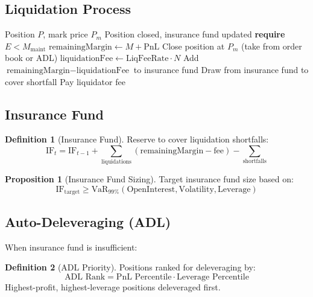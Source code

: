 \documentclass[11pt,a4paper]{article}
\theoremstyle{definition}
\newtheorem{definition}{Definition}
\newtheorem{proposition}{Proposition}
\begin{document}
\subsection{Liquidation Process}

\begin{algorithm}
\caption{Position Liquidation}
\begin{algorithmic}[1]
\Require Position $P$, mark price $P_m$
\Ensure Position closed, insurance fund updated
\State \textbf{require} $E < M_{\text{maint}}$
\State $\text{remainingMargin} \gets M + \text{PnL}$
\State Close position at $P_m$ (take from order book or ADL)
\State $\text{liquidationFee} \gets \text{LiqFeeRate} \cdot N$
\State Add $\text{remainingMargin} - \text{liquidationFee}$ to insurance fund
\Else
\State Draw from insurance fund to cover shortfall
\EndIf
\State Pay liquidator fee
\end{algorithmic}
\end{algorithm}

\subsection{Insurance Fund}

\begin{definition}[Insurance Fund]
Reserve to cover liquidation shortfalls:
\begin{equation}
\text{IF}_t = \text{IF}_{t-1} + \sum_{\text{liquidations}} (\text{remainingMargin} - \text{fee}) - \sum_{\text{shortfalls}}
\end{equation}
\end{definition}

\begin{proposition}[Insurance Fund Sizing]
Target insurance fund size based on:
\begin{equation}
\text{IF}_{\text{target}} \geq \text{VaR}_{99\%}(\text{OpenInterest}, \text{Volatility}, \text{Leverage})
\end{equation}
\end{proposition}

\subsection{Auto-Deleveraging (ADL)}

When insurance fund is insufficient:

\begin{definition}[ADL Priority]
Positions ranked for deleveraging by:
\begin{equation}
\text{ADL Rank} = \text{PnL Percentile} \cdot \text{Leverage Percentile}
\end{equation}
Highest-profit, highest-leverage positions deleveraged first.
\end{definition}
\end{document}
